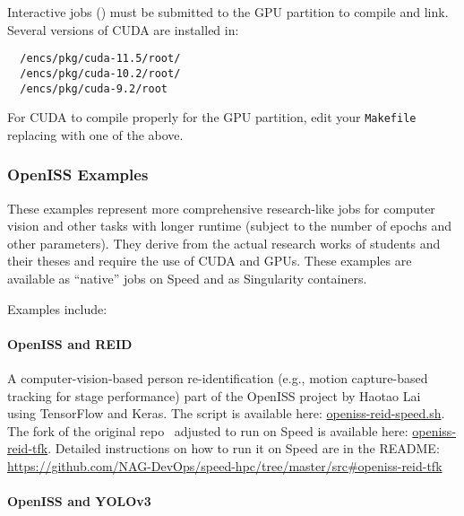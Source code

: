 Interactive jobs () must be submitted to the GPU partition to compile and link.
Several versions of CUDA are installed in:
\begin{verbatim}
  /encs/pkg/cuda-11.5/root/
  /encs/pkg/cuda-10.2/root/
  /encs/pkg/cuda-9.2/root
\end{verbatim}

\noindent For CUDA to compile properly for the GPU partition, edit your \texttt{Makefile}
replacing  with one of the above.

\subsubsection{OpenISS Examples}
\label{sect:openiss-examples}

These examples represent more comprehensive research-like jobs
for computer vision and other tasks with longer runtime (subject to the number of epochs and other parameters).
They derive from the actual research works of students and their theses and require the use of CUDA and GPUs.
These examples are available as ``native'' jobs on Speed and as Singularity containers.

\noindent Examples include:
\paragraph{OpenISS and REID}
\label{sect:openiss-reid}

A computer-vision-based person re-identification 
(e.g., motion capture-based tracking for stage performance) part of the OpenISS
project by Haotao Lai~\cite{lai-haotao-mcthesis19} using TensorFlow and Keras.
The script is available here:
\href{https://github.com/NAG-DevOps/speed-hpc/blob/master/src/openiss-reid-speed.sh}{openiss-reid-speed.sh}.
The fork of the original repo~\cite{openiss-reid-tfk} adjusted to run on Speed is available here:
\href{https://github.com/NAG-DevOps/openiss-reid-tfk}{openiss-reid-tfk}.
Detailed instructions on how to run it on Speed are in the README:
\url{https://github.com/NAG-DevOps/speed-hpc/tree/master/src#openiss-reid-tfk}

\paragraph{OpenISS and YOLOv3}
\label{sect:openiss-yolov3}

